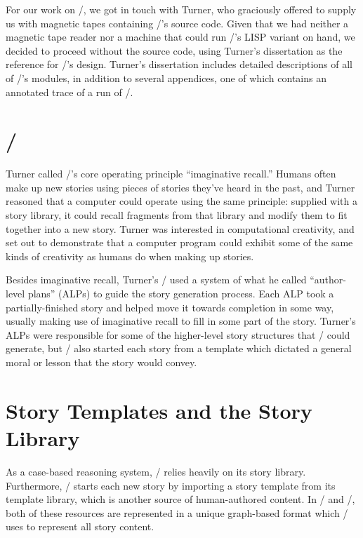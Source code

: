 For our work on \skald/, we got in touch with Turner, who graciously offered to supply us with magnetic tapes containing \minstrel/'s source code.
%
Given that we had neither a magnetic tape reader nor a machine that could run \minstrel/'s LISP variant on hand, we decided to proceed without the source code, using Turner's dissertation as the reference for \minstrel/'s design.
%
Turner's dissertation includes detailed descriptions of all of \minstrel/'s
modules, in addition to several appendices, one of which contains an annotated
trace of a run of \minstrel/.



\section{\skald/}


Turner called \minstrel/'s core operating principle ``imaginative recall.''
%
Humans often make up new stories using pieces of stories they've heard in the past, and Turner reasoned that a computer could operate using the same principle: supplied with a story library, it could recall fragments from that library and modify them to fit together into a new story.
%
Turner was interested in computational creativity, and set out to demonstrate that a computer program could exhibit some of the same kinds of creativity as humans do when making up stories.


Besides imaginative recall, Turner's \minstrel/ used a system of what he called ``author-level plans'' (ALPs) to guide the story generation process.
%
Each ALP took a partially-finished story and helped move it towards completion in some way, usually making use of imaginative recall to fill in some part of the story.
%
Turner's ALPs were responsible for some of the higher-level story structures that \minstrel/ could generate, but \minstrel/ also started each story from a template which dictated a general moral or lesson that the story would convey.

\section{Story Templates and the Story Library}

As a case-based reasoning system, \minstrel/ relies heavily on its story library.
%
Furthermore, \minstrel/ starts each new story by importing a story template from its template library, which is another source of human-authored content.
%
In \minstrel/ and \skald/, both of these resources are represented in a unique graph-based format which \minstrel/ uses to represent all story content.


